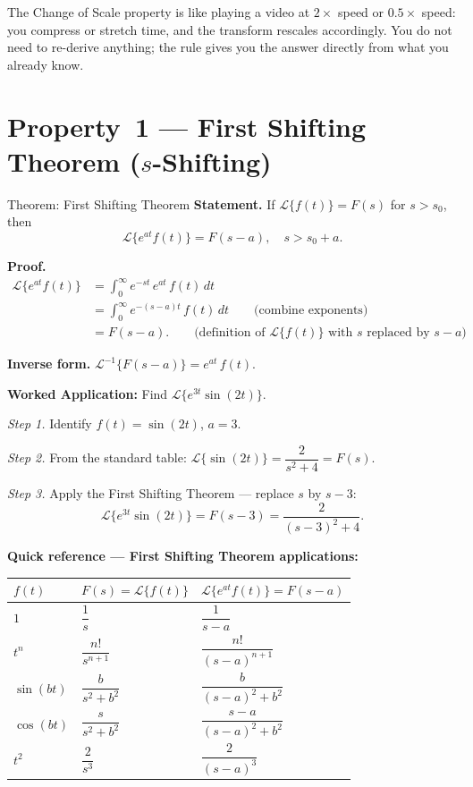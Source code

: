 \documentclass[12pt,a4paper]{article}
\begin{document}
The Change of Scale property is like playing a video at $2\times$ speed or $0.5\times$ speed:
you compress or stretch time, and the transform rescales accordingly. You do not need to re-derive
anything; the rule gives you the answer directly from what you already know.

\section{Property~1 --- First Shifting Theorem ($s$-Shifting)}

\begin{infobox}{Theorem: First Shifting Theorem}
\textbf{Statement.} If $\mathcal{L}\{f(t)\} = F(s)$ for $s > s_0$, then
\[
  \mathcal{L}\{e^{at}f(t)\} = F(s-a), \quad s > s_0 + a.
\]

\textbf{Proof.}
\begin{align*}
  \mathcal{L}\{e^{at}f(t)\}
  &= \int_0^{\infty} e^{-st}\,e^{at}\,f(t)\,dt \\
  &= \int_0^{\infty} e^{-(s-a)t}\,f(t)\,dt \qquad \text{(combine exponents)} \\
  &= F(s-a). \qquad \text{(definition of } \mathcal{L}\{f(t)\}\text{ with }s\text{ replaced by }s-a\text{)}
\end{align*}

\textbf{Inverse form.} $\mathcal{L}^{-1}\{F(s-a)\} = e^{at}\,f(t)$.

\bigskip
\textbf{Worked Application: } Find $\mathcal{L}\{e^{3t}\sin(2t)\}$.

\emph{Step 1.} Identify $f(t) = \sin(2t)$, $a = 3$.

\emph{Step 2.} From the standard table: $\mathcal{L}\{\sin(2t)\} = \dfrac{2}{s^2 + 4} = F(s)$.

\emph{Step 3.} Apply the First Shifting Theorem --- replace $s$ by $s - 3$:
\[
  \mathcal{L}\{e^{3t}\sin(2t)\} = F(s-3) = \frac{2}{(s-3)^2 + 4}.
\]

\textbf{Quick reference --- First Shifting Theorem applications:}

\vspace{0.3em}
\begin{tabular}{@{}lll@{}}
\toprule
$f(t)$ & $F(s) = \mathcal{L}\{f(t)\}$ & $\mathcal{L}\{e^{at}f(t)\} = F(s-a)$ \\
\midrule
$1$ & $\dfrac{1}{s}$ & $\dfrac{1}{s-a}$ \\[6pt]
$t^n$ & $\dfrac{n!}{s^{n+1}}$ & $\dfrac{n!}{(s-a)^{n+1}}$ \\[6pt]
$\sin(bt)$ & $\dfrac{b}{s^2+b^2}$ & $\dfrac{b}{(s-a)^2+b^2}$ \\[6pt]
$\cos(bt)$ & $\dfrac{s}{s^2+b^2}$ & $\dfrac{s-a}{(s-a)^2+b^2}$ \\[6pt]
$t^2$ & $\dfrac{2}{s^3}$ & $\dfrac{2}{(s-a)^3}$ \\
\bottomrule
\end{tabular}
\end{infobox}
\end{document}
